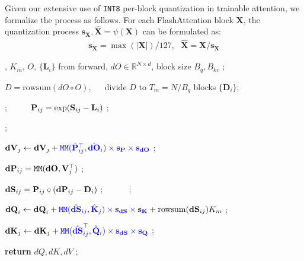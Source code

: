Given our extensive use of \texttt{INT8} per-block quantization in trainable attention, we formalize the process as follows. For each FlashAttention block $\mathbf{X}$, the quantization process $\mathbf{s_X}, \mathbf{\hat X} = \psi(\mathbf{X})$ can be formulated as:
\begin{align}
    \mathbf{s_X} = \max(|\mathbf{X}|)/127, ~~~ \mathbf{\hat X}=\mathbf{X}/\mathbf{s_X}
\end{align}
\begin{algorithm}[H]
    \small
    \caption{Backward pass of the \texttt{8-bit} attention.}
    \label{alg:int8_train_bwd} 
    \begin{algorithmic}[1]
     , $K_m$, $O$, $\{\mathbf{L}_i\}$ from forward, $dO \in \mathbb{R}^{N \times d}$, block size $B_q, B_{kv}$ ; 

    \STATE $D = \mathrm{rowsum}(dO \circ O)$, ~~ divide $D$ to $T_m = {N}/{B_q}$ blocks $\{\mathbf{D}_i\}$; 



            \STATE {} ;  ~~~~~$\mathbf{P}_{ij} = \mathrm{exp}(\mathbf{S}_{ij} - \mathbf{L}_{i})$ ;

            \STATE {} ; ~

            \STATE $\mathbf{dV}_j \leftarrow \mathbf{dV}_j + \textcolor{blue}{{\texttt{MM}(\hat {\mathbf{P}}_{ij}^\top, \hat {\mathbf{dO}}_{i}) \times \mathbf{s_P} \times \mathbf{s_{dO}}}}$ ;

            \STATE $\mathbf{dP}_{ij} = \texttt{MM}(\mathbf{dO}, \mathbf{V}_j^\top)$ ;  ~

            \STATE $\mathbf{dS}_{ij} = \mathbf{P}_{ij} \circ (\mathbf{dP}_{ij} - \mathbf{D}_i)$ ; ~~~~~ ; ~

            \STATE $\mathbf{dQ}_i \leftarrow \mathbf{dQ}_i + \textcolor{blue}{{\texttt{MM}(\hat {\mathbf{dS}}_{ij}, \hat {\mathbf{K}}_{j}) \times \mathbf{s_{dS}} \times \mathbf{s_K}}} + {\rm rowsum}(\mathbf{dS}_{ij}) K_m$ ; 

            \STATE $\mathbf{dK}_j \leftarrow \mathbf{dK}_j + \textcolor{blue}{{\texttt{MM}(\hat {\mathbf{dS}}^\top_{ij}, \hat {\mathbf{Q}}_{i}) \times \mathbf{s_{dS}} \times \mathbf{s_Q}}}$ ;

        \ENDFOR

    \ENDFOR
    
    \STATE \textbf{return} $dQ, dK, dV$ ;
    \end{algorithmic}
    \vspace{-.15em}
\end{algorithm}
